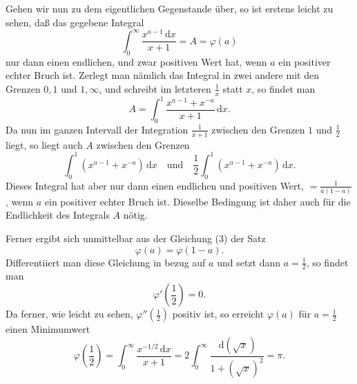 \documentclass[11pt]{article}
\newcommand{\dd}{\,\mathrm d}
\begin{document}
Gehen wir nun zu dem eigentlichen Gegenstande über, so ist erstens leicht zu sehen, daß das gegebene Integral
\begin{equation}
\int_0^\infty\frac{x^{a-1}\dd x}{x+1}=A=\varphi(a)
\tag{2}
\end{equation}
nur dann einen endlichen, und zwar positiven Wert hat, wenn $a$ ein positiver echter Bruch ist. Zerlegt man nämlich das Integral in zwei andere mit den Grenzen $0,1$ und $1,\infty$, und schreibt im letzteren $\frac1x$ statt $x$, so findet man
\begin{equation}
A=\int_0^1\frac{x^{a-1}+x^{-a}}{x+1}\dd x.
\tag{3}
\end{equation}
Da nun im ganzen Intervall der Integration $\frac1{x+1}$ zwischen den Grenzen $1$ und $\frac12$ liegt, so liegt auch $A$ zwischen den Grenzen
\[
\int_0^1(x^{a-1}+x^{-a})\dd x
\quad\text{und}\quad
\frac12\int_0^1(x^{a-1}+x^{-a})\dd x.
\]
Dieses Integral hat aber nur dann einen endlichen und positiven Wert, $=\frac1{a(1-a)}$, wenn $a$ ein positiver echter Bruch ist. Dieselbe Bedingung ist daher auch für die Endlichkeit des Integrals $A$ nötig.

Ferner ergibt sich unmittelbar aus der Gleichung (3) der Satz
\begin{equation}
\varphi(a)=\varphi(1-a).
\tag{4}
\end{equation}
Differentiiert man diese Gleichung in bezug auf $a$ und setzt dann $a=\frac12$, so findet man
\begin{equation}
\varphi'\!\left(\frac12\right)=0.
\tag{5}
\end{equation}
Da ferner, wie leicht zu sehen, $\varphi''(\frac12)$ positiv ist, so erreicht $\varphi(a)$ für $a=\frac12$ einen Minimumwert
\begin{equation}
\varphi\!\left(\frac12\right)
=\int_0^\infty\frac{x^{-1/2}\dd x}{x+1}
=2\int_0^\infty\frac{\dd(\sqrt{x})}{1+(\sqrt{x})^2}=\pi.
\tag{6}
\end{equation}
\end{document}

